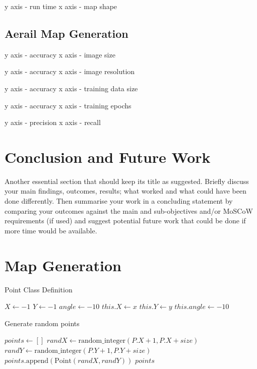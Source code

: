 \documentclass[final]{cmpreport_02}
\begin{document}
y axis - run time
x axis - map shape

\subsection{Aerail Map Generation}

y axis - accuracy
x axis - image size

y axis - accuracy
x axis - image resolution

y axis - accuracy
x axis - training data size

y axis - accuracy
x axis - training epochs

y axis - precision
x axis - recall
\section{Conclusion and Future Work}


Another essential section that should keep its title as suggested. Briefly discuss your main findings, outcomes, results; what worked and what could have been done differently. Then summarise your work in a concluding statement by comparing your outcomes against the main and sub-objectives and/or MoSCoW requirements (if used) and suggest potential future work that could be done if more time would be available.


\clearpage



\appendix
\clearpage

\section{Map Generation}

\begin{algorithm}[h!]
	\caption{Point Class Definition}
	\label{mg:point class}
	\begin{algorithmic}[1]
		\State $X \gets -1$ 
		\State $Y \gets -1$ 
		\State $angle \gets -10$ 
		\State $this.X \gets x$
		\State $this.Y \gets y$
		\State $this.angle \gets -10$ 
		\EndProcedure
		\EndProcedure
	\end{algorithmic}
\end{algorithm}

\begin{algorithm}[h!]
	\caption{Generate random points}
	\label{mg:genPoints}
	\begin{algorithmic}[1]
		\State $points \gets []$
		\State $randX \gets \text{random\_integer}(P.X + 1, P.X + size)$
		\State $randY \gets \text{random\_integer}(P.Y + 1, P.Y + size)$
		\State $points.\text{append}(\text{Point}(randX, randY))$
		\EndFor
		\State \Return $points$
		\EndFunction
	\end{algorithmic}
\end{algorithm}
\end{document}
